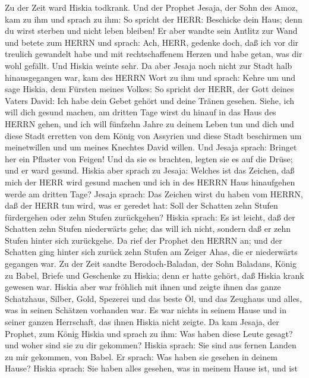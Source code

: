  Zu der Zeit ward Hiskia todkrank. Und der Prophet Jesaja,
der Sohn des Amoz, kam zu ihm und sprach zu ihm: So spricht der HERR:
Beschicke dein Haus; denn du wirst sterben und nicht leben bleiben!
 Er aber wandte sein Antlitz zur Wand und betete zum HERRN
und sprach:  Ach, HERR, gedenke doch, daß ich vor dir
treulich gewandelt habe und mit rechtschaffenem Herzen und habe getan,
was dir wohl gefällt. Und Hiskia weinte sehr.  Da aber
Jesaja noch nicht zur Stadt halb hinausgegangen war, kam des HERRN Wort
zu ihm und sprach:  Kehre um und sage Hiskia, dem Fürsten
meines Volkes: So spricht der HERR, der Gott deines Vaters David: Ich
habe dein Gebet gehört und deine Tränen gesehen. Siehe, ich will dich
gesund machen, am dritten Tage wirst du hinauf in das Haus des HERRN
gehen,  und ich will fünfzehn Jahre zu deinem Leben tun und
dich und diese Stadt erretten von dem König von Assyrien und diese Stadt
beschirmen um meinetwillen und um meines Knechtes David willen.
 Und Jesaja sprach: Bringet her ein Pflaster von Feigen! Und
da sie es brachten, legten sie es auf die Drüse; und er ward gesund.
 Hiskia aber sprach zu Jesaja: Welches ist das Zeichen, daß
mich der HERR wird gesund machen und ich in des HERRN Haus hinaufgehen
werde am dritten Tage?  Jesaja sprach: Das Zeichen wirst du
haben vom HERRN, daß der HERR tun wird, was er geredet hat: Soll der
Schatten zehn Stufen fürdergehen oder zehn Stufen zurückgehen?
 Hiskia sprach: Es ist leicht, daß der Schatten zehn Stufen
niederwärts gehe; das will ich nicht, sondern daß er zehn Stufen hinter
sich zurückgehe.  Da rief der Prophet den HERRN an; und der
Schatten ging hinter sich zurück zehn Stufen am Zeiger Ahas, die er
niederwärts gegangen war.  Zu der Zeit sandte
Berodoch-Baladan, der Sohn Baladans, König zu Babel, Briefe und
Geschenke zu Hiskia; denn er hatte gehört, daß Hiskia krank gewesen war.
 Hiskia aber war fröhlich mit ihnen und zeigte ihnen das
ganze Schatzhaus, Silber, Gold, Spezerei und das beste Öl, und das
Zeughaus und alles, was in seinen Schätzen vorhanden war. Es war nichts
in seinem Hause und in seiner ganzen Herrschaft, das ihnen Hiskia nicht
zeigte.  Da kam Jesaja, der Prophet, zum König Hiskia und
sprach zu ihm: Was haben diese Leute gesagt? und woher sind sie zu dir
gekommen? Hiskia sprach: Sie sind aus fernen Landen zu mir gekommen, von
Babel.  Er sprach: Was haben sie gesehen in deinem Hause?
Hiskia sprach: Sie haben alles gesehen, was in meinem Hause ist, und ist
